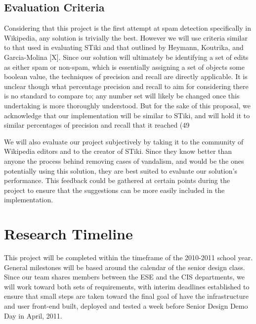 \documentclass[letterpaper]{sig-alternate}
\begin{document}
\subsection{Evaluation Criteria}
\label{subsec:eval_criteria}
Considering that this project is the first attempt at spam detection specifically in Wikipedia, any solution is trivially the best. However we will use criteria similar to that used in evaluating STiki and that outlined by Heymann, Koutrika, and Garcia-Molina [X]. Since our solution will ultimately be identifying a set of edits as either spam or non-spam, which is essentially assigning a set of objects some boolean value, the techniques of precision and recall are directly applicable. It is unclear though what percentage precision and recall to aim for considering there is no standard to compare to; any number set will likely be changed once this undertaking is more thoroughly understood. But for the sake of this proposal, we acknowledge that our implementation will be similar to STiki, and will hold it to similar percentages of precision and recall that it reached (49%

We will also evaluate our project subjectively by taking it to the community of Wikipedia editors and to the creator of STiki. Since they know better than anyone the process behind removing cases of vandalism, and would be the ones potentially using this solution, they are best suited to evaluate our solution’s performance. This feedback could be gathered at certain points during the project to ensure that the suggestions can be more easily included in the implementation.

\section{Research Timeline}
\label{sec:research_timeline}
This project will be completed within the timeframe of the 2010-2011 school year. General milestones will be based around the calendar of the senior design class. Since our team shares members between the ESE and the CIS departments, we will work toward both sets of requirements, with interim deadlines established to ensure that small steps are taken toward the final goal of have the infrastructure and user front-end built, deployed and tested a week before Senior Design Demo Day in April, 2011.
\end{document}
